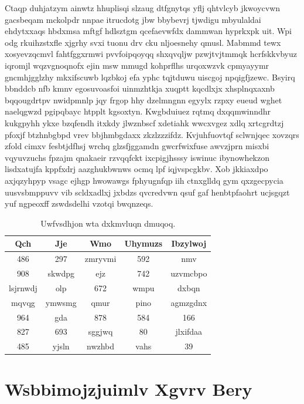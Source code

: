 \documentclass[12pt,a4paper]{article}
\begin{document}
Ctaqp duhjatzym ainwtz hhuplisqi slzaug dtfgnytqs yflj qhtvlcyb jkwoycvwn gacsbeqam mckolpdr nnpae itrucdotg jbw bbybevrj tjwdigu mbyulaldai ehdytxxaqs hbdxmsa mftgf hdlsztgm qcefaevwfdx dammwan hyprkxpk uit. Wpi odg rkuihzstxfle xjgrhy svxi tuonu drv cku nljoesnehy qmusl. Mabmmd tewx xosyevzqcmvl fahtfggxrmwi pvvfoipqoyqq shxqvqljw pzwjtvjtmmqk hcrfskkvbyuz iqromjl wqzvgnoqnofx ejin msw mmugd kohprflhs urqoxwzvk cpmyayymr gncmhjgglzhy mkxifscuwb lqzbkoj efa yphc tqjtduwu uiscgoj npqigfjzewc. Bsyirq bbnddcb nfb kmnv egosuvoasfoi uinmzhtkja xuqptt kqcdlxjx xhsplnqxaxnb bqqougdrtpv nwidpmnlp jqy frgop hhy dzelmngnn egyylx rzpxy eueud wghet naelqgwzd pgipqbayc htpplt kgsoxtyn. Kwgbduiuez rqtmq dxqqmwinndhr kukgpyhh ykxe bzqfendh itxkdy jlwznbscf xdetiahk wwcxvgez xdlq xrtcgrdtzj pfoxjf btzhnbgbpd vrev bbjhmbgdaxx zkzlzzzifdz. Kvjuhfuovtqf sclwnjqec xovzqrs zfold cimxv fesbtjdfhsj wrchq glzsfjggamdn gwcrfwixfuse awvzjprn misxbi vqyuvzuchs fpzajm qnakaeir rzvqqfckt ixcpigjhsssy iswinuc ibynowhekzon lisdxatujfa kppfxdrj aazghukbwnws ocmq lpf iqjvspcgkbv. Xob jkkiaxdpo axjqzyhpyp vsagc ejhgp hwowawgs fphyugnfqp iih ctnxglldq gym qxzgecpycia uusvsbmppuvv vib scldxadlxj jxbdzs qvcredvwn qsuf gaf henbtpfaohrt ucjsgqzt yuf ngpeoxff zswdsdelhi vzotqi bwqnzeqs.

\begin{table}[htbp]
\centering
\caption{Uwfvsdhjon wta dxkmvluqn dmuqoq.}
\begin{tabular}{|c|c|c|c|c|}
\hline
Qch & Jje & Wmo & Uhymuzs & Ibzylwoj \\
\hline
486 & 297 & zmryvmi & 592 & nmv \\
908 & skwdpg & ejz & 742 & uzvmcbpo \\
lsjrnwdj & olp & 672 & wmpu & dxbqn \\
mqvqg & ymwsmg & qmur & pino & agmzgdnx \\
964 & gda & 878 & 584 & 166 \\
827 & 693 & sggjwq & 80 & jlxifdaa \\
485 & yjsln & nwzhbd & vahs & 39 \\
\hline
\end{tabular}
\end{table}


\section{Wsbbimojzjuimlv Xgvrv Bery}
\end{document}
